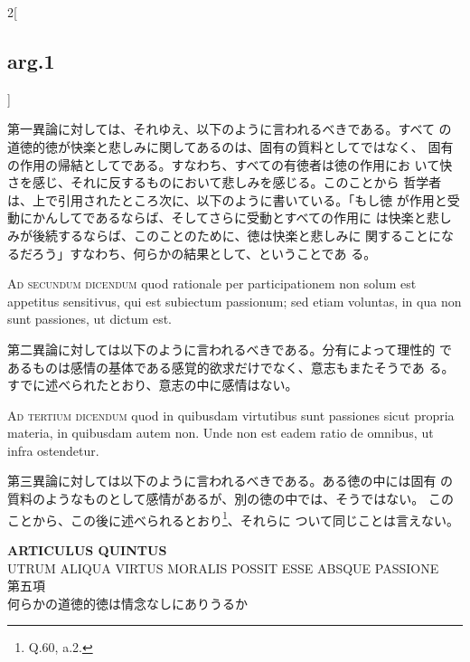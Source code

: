 \documentclass[paper=a4paper,fontsize=10pt,jafontsize=9pt,titlepage]{jlreq}
\begin{document}
\begin{paracol}{2}[\subsection{arg.1}]
\switchcolumn

第一異論に対しては、それゆえ、以下のように言われるべきである。すべて
 の道徳的徳が快楽と悲しみに関してあるのは、固有の質料としてではなく、
 固有の作用の帰結としてである。すなわち、すべての有徳者は徳の作用にお
 いて快さを感じ、それに反するものにおいて悲しみを感じる。このことから
 哲学者は、上で引用されたところ次に、以下のように書いている。「もし徳
 が作用と受動にかんしてであるならば、そしてさらに受動とすべての作用に
 は快楽と悲しみが後続するならば、このことのために、徳は快楽と悲しみに
 関することになるだろう」すなわち、何らかの結果として、ということであ
 る。

\switchcolumn*[\subsection{ad.2}]

{\scshape Ad secundum dicendum} quod rationale per participationem non
solum est appetitus sensitivus, qui est subiectum passionum; sed etiam
voluntas, in qua non sunt passiones, ut dictum est.

\switchcolumn

第二異論に対しては以下のように言われるべきである。分有によって理性的
 であるものは感情の基体である感覚的欲求だけでなく、意志もまたそうであ
 る。すでに述べられたとおり、意志の中に感情はない。

\switchcolumn*[\subsection{ad.3}]

{\scshape Ad tertium dicendum} quod in quibusdam virtutibus sunt
passiones sicut propria materia, in quibusdam autem non. Unde non est
eadem ratio de omnibus, ut infra ostendetur.

\switchcolumn

第三異論に対しては以下のように言われるべきである。ある徳の中には固有
 の質料のようなものとして感情があるが、別の徳の中では、そうではない。
 このことから、この後に述べられるとおり\footnote{Q.60, a.2.}、それらに
 ついて同じことは言えない。

\end{paracol}
\newpage
{}
{}
\setcounter{section}{5}
\setcounter{subsection}{0}



\begin{center}
{\Large {\bfseries ARTICULUS QUINTUS}}\\
{\large UTRUM ALIQUA VIRTUS MORALIS POSSIT ESSE ABSQUE PASSIONE}\\
{\Large 第五項\\何らかの道徳的徳は情念なしにありうるか}
\end{center}
\end{document}
